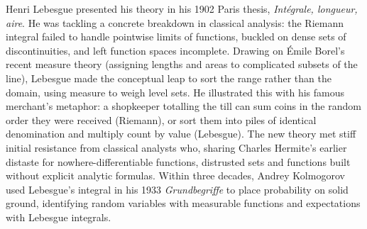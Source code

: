 \begin{historybox}
Henri Lebesgue presented his theory in his 1902 Paris thesis,
\emph{Int\'egrale, longueur, aire}. He was tackling a concrete breakdown in
classical analysis: the Riemann integral failed to handle pointwise limits of
functions, buckled on dense sets of discontinuities, and left function spaces
incomplete. Drawing on Émile Borel's recent measure theory (assigning lengths
and areas to complicated subsets of the line), Lebesgue made the conceptual leap
to sort the range rather than the domain, using measure to weigh level sets. He
illustrated this with his famous merchant's metaphor: a shopkeeper totalling the
till can sum coins in the random order they were received (Riemann), or sort
them into piles of identical denomination and multiply count by value (Lebesgue).
The new theory met stiff initial resistance from classical analysts who, sharing
Charles Hermite's earlier distaste for nowhere-differentiable functions, distrusted
sets and functions built without explicit analytic formulas.
Within three decades, Andrey Kolmogorov used Lebesgue's integral in his 1933
\emph{Grundbegriffe} to place probability on solid ground, identifying random
variables with measurable functions and expectations with Lebesgue integrals.
\end{historybox}

